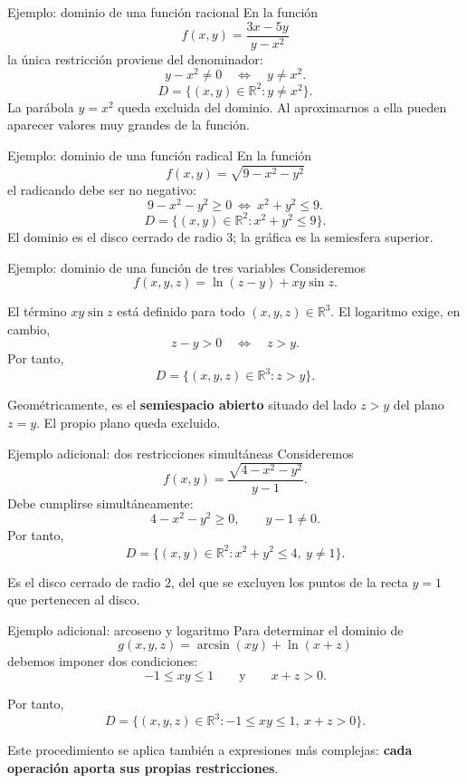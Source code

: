 \documentclass[main.tex]{subfiles}
\begin{document}
\begin{frame}{Ejemplo: dominio de una función racional}
En la función
\[
f(x,y)=\frac{3x-5y}{y-x^2}
\]
la única restricción proviene del denominador:
\[
y-x^2\ne0 \quad\Longleftrightarrow\quad y\ne x^2.
\]
\[
D=\{(x,y)\in\mathbb R^2:y\ne x^2\}.
\]
\vspace{-2mm}
\vspace{-2mm}
\small La parábola $y=x^2$ queda excluida del dominio. Al aproximarnos a ella pueden aparecer valores muy grandes de la función.
\end{frame}
\begin{frame}{Ejemplo: dominio de una función radical}
En la función
\[
f(x,y)=\sqrt{9-x^2-y^2}
\]
el radicando debe ser no negativo:
\[
9-x^2-y^2\ge0\ \Longleftrightarrow\ x^2+y^2\le9.
\]
\[
D=\{(x,y)\in\mathbb R^2:x^2+y^2\le9\}.
\]
\vspace{-2mm}
\vspace{-2mm}
\small El dominio es el disco cerrado de radio $3$; la gráfica es la semiesfera superior.
\end{frame}
\begin{frame}{Ejemplo: dominio de una función de tres variables}
Consideremos
\[
f(x,y,z)=\ln(z-y)+xy\sin z.
\]
\medskip

El término $xy\sin z$ está definido para todo $(x,y,z)\in\mathbb R^3$. El logaritmo exige, en cambio,
\[
z-y>0\quad\Longleftrightarrow\quad z>y.
\]
Por tanto,
\[
D=\{(x,y,z)\in\mathbb R^3:z>y\}.
\]
\medskip

Geométricamente, es el \textbf{semiespacio abierto} situado del lado $z>y$ del plano $z=y$. El propio plano queda excluido.
\end{frame}
\begin{frame}{Ejemplo adicional: dos restricciones simultáneas}
Consideremos
\[
f(x,y)=\frac{\sqrt{4-x^2-y^2}}{y-1}.
\]
Debe cumplirse simultáneamente:
\[
4-x^2-y^2\geq0,\qquad y-1\ne0.
\]
Por tanto,
\[
\boxed{D=\{(x,y)\in\mathbb R^2:
x^2+y^2\leq4,\ y\ne1\}.}
\]
\medskip

Es el disco cerrado de radio $2$, del que se excluyen los puntos de la recta $y=1$ que pertenecen al disco.
\end{frame}


\begin{frame}{Ejemplo adicional: arcoseno y logaritmo}
Para determinar el dominio de
\[
g(x,y,z)=\arcsin(xy)+\ln(x+z)
\]
debemos imponer dos condiciones:
\[
-1\le xy\le1
\qquad\text{y}\qquad x+z>0.
\]
\medskip

Por tanto,
\[
D=\{(x,y,z)\in\mathbb R^3:
-1\le xy\le1,\ x+z>0\}.
\]
\medskip

Este procedimiento se aplica también a expresiones más complejas: \textbf{cada operación aporta sus propias restricciones}.
\end{frame}
\end{document}

